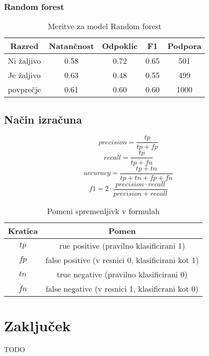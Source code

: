\documentclass{acm_proc_article-sp}
\begin{document}
\subsubsection{Random forest}
\begin{table}[h!]
	\centering
	\caption{Meritve za model Random forest}
	\begin{tabular}{|c|c|c|c|c|}
		\hline
		\textbf{Razred} & \textbf{Natančnost} & \textbf{Odpoklic} & \textbf{F1} & \textbf{Podpora} \\ \hline
		Ni žaljivo & 0.58 & 0.72 & 0.65 & 501 \\ \hline
		Je žaljivo & 0.63 & 0.48 & 0.55 & 499 \\ \hline \hline
		povprečje & 0.61 & 0.60 & 0.60 & 1000 \\ \hline
	\end{tabular}
\end{table}

\subsection{Način izračuna}
$$ precision = \frac{tp}{tp + fp} $$
$$ recall = \frac{tp}{tp + fn} $$
$$ accuracy = \frac{tp + tn}{tp + tn + fp + fn} $$
$$ f1 = 2 \cdot \frac{precision \cdot recall}{precision + recall} $$

\begin{table}[h!]
	\centering
	\caption{Pomeni spremenljivk v formulah}
	\begin{tabular}{|c|c|} 
		\hline
		\textbf{Kratica} & \textbf{Pomen} \\ \hline
		$ tp $ & rue positive (pravilno klasificirani 1) \\ \hline
		$ fp $ & false positive (v resnici 0, klasificirani kot 1) \\ \hline
		$ tn $ & true negative (pravilno klasificirani 0) \\ \hline
		$ fn $ & false negative (v resnici 1, klasificrani kot 0) \\ \hline		
	\end{tabular}
\end{table}

\section{Zaključek}
TODO


 
\end{document}

